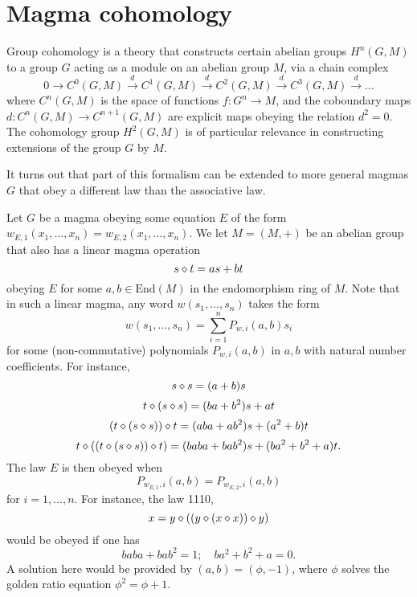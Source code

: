 \chapter{Magma cohomology}\label{cohomology-chapter}

Group cohomology is a theory that constructs certain abelian groups $H^n(G,M)$ to a group $G$ acting as a module on an abelian group $M$, via a chain complex
$$ 0 \to C^0(G,M) \stackrel{d}{\to} C^1(G,M) \stackrel{d}{\to} C^2(G,M) \stackrel{d}{\to} C^3(G,M) \stackrel{d}{\to} \dots$$
where $C^n(G,M)$ is the space of functions $f: G^n \to M$, and the coboundary maps $d: C^n(G,M) \to C^{n+1}(G,M)$ are explicit maps obeying the relation $d^2=0$.  The cohomology group $H^2(G,M)$ is of particular relevance in constructing extensions of the group $G$ by $M$.

It turns out that part of this formalism can be extended to more general magmas $G$ that obey a different law than the associative law.

Let $G$ be a magma obeying some equation $E$ of the form $w_{E,1}(x_1,\dots,x_n) = w_{E,2}(x_1,\dots,x_n)$.  We let $M = (M,+)$ be an abelian group that also has a linear magma operation
$$ s \diamond t = as + bt$$
obeying $E$ for some $a,b \in \mathrm{End}(M)$ in the endomorphism ring of $M$.    Note that in such a linear magma, any word $w(s_1,\dots,s_n)$ takes the form
$$ w(s_1,\dots,s_n) = \sum_{i=1}^n P_{w,i}(a,b) s_i$$
for some (non-commutative) polynomials $P_{w,i}(a,b)$ in $a,b$ with natural number coefficients.  For instance,
$$ s \diamond s = (a+b) s$$
$$ t \diamond (s \diamond s) = (ba+b^2) s + at$$
$$ (t \diamond (s \diamond s)) \diamond t = (aba+ab^2) s + (a^2+b)t$$
$$ t \diamond ((t \diamond (s \diamond s)) \diamond t) = (baba+bab^2) s + (ba^2+b^2+a)t.$$
The law $E$ is then obeyed when
$$ P_{w_{E,1},i}(a,b)= P_{w_{E,2},i}(a,b)$$
for $i=1,\dots,n$.  For instance, the law 1110,
\begin{equation}\label{1110}
  x = y \diamond ((y \diamond (x \diamond x)) \diamond y)
\end{equation}
would be obeyed if one has
\begin{equation}\label{baba}
 baba+bab^2 = 1; \quad ba^2+b^2+a = 0.
\end{equation}
A solution here would be provided by $(a,b) = (\phi,-1)$, where $\phi$ solves the golden ratio equation $\phi^2 = \phi + 1$.

